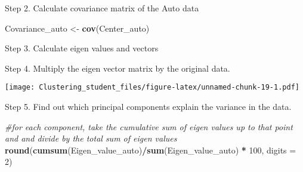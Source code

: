\documentclass[11pt,]{article}
\newenvironment{Shaded}{\begin{snugshade}}{\end{snugshade}}
\newcommand{\CommentTok}[1]{\textcolor[rgb]{0.56,0.35,0.01}{\textit{#1}}}
\newcommand{\DataTypeTok}[1]{\textcolor[rgb]{0.13,0.29,0.53}{#1}}
\newcommand{\DecValTok}[1]{\textcolor[rgb]{0.00,0.00,0.81}{#1}}
\newcommand{\KeywordTok}[1]{\textcolor[rgb]{0.13,0.29,0.53}{\textbf{#1}}}
\newcommand{\NormalTok}[1]{#1}
\newcommand{\OperatorTok}[1]{\textcolor[rgb]{0.81,0.36,0.00}{\textbf{#1}}}
\newcommand{\StringTok}[1]{\textcolor[rgb]{0.31,0.60,0.02}{#1}}
\begin{document}
Step 2. Calculate covariance matrix of the Auto data

\begin{Shaded}
\begin{Highlighting}[]
\NormalTok{Covariance_auto <-}\StringTok{ }\KeywordTok{cov}\NormalTok{(Center_auto)}
\end{Highlighting}
\end{Shaded}

Step 3. Calculate eigen values and vectors

\begin{Shaded}
\end{Shaded}

Step 4. Multiply the eigen vector matrix by the original data.

\begin{Shaded}
\end{Shaded}

\texttt{[image: Clustering\_student\_files/figure-latex/unnamed-chunk-19-1.pdf]}

Step 5. Find out which principal components explain the variance in the
data.

\begin{Shaded}
\begin{Highlighting}[]
\CommentTok{#for each component, take the cumulative sum of eigen values up to that point and and divide by the total sum of eigen values}
\KeywordTok{round}\NormalTok{(}\KeywordTok{cumsum}\NormalTok{(Eigen_value_auto)}\OperatorTok{/}\KeywordTok{sum}\NormalTok{(Eigen_value_auto) }\OperatorTok{*}\StringTok{ }\DecValTok{100}\NormalTok{, }\DataTypeTok{digits =} \DecValTok{2}\NormalTok{)}
\end{Highlighting}
\end{Shaded}
\end{document}
